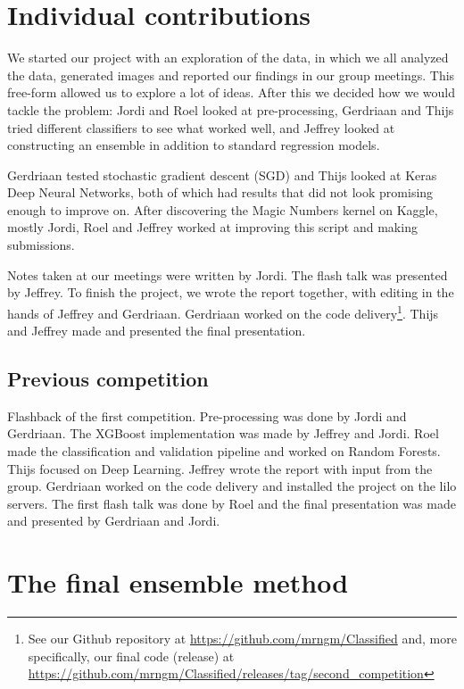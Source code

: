 \documentclass[a4paper,11pt,twocolumn]{article}
\begin{document}
\section{Individual contributions}
We started our project with an exploration of the data, in which we all
analyzed the data, generated images and reported our findings in our group
meetings. This free-form allowed us to explore a lot of ideas. After this we
decided how we would tackle the problem: Jordi and Roel looked at
pre-processing, Gerdriaan and Thijs tried different classifiers to see what
worked well, and Jeffrey looked at constructing an ensemble in addition to
standard regression models.

Gerdriaan tested stochastic gradient descent (SGD) and Thijs looked at Keras
Deep Neural Networks, both of which had results that did not look promising
enough to improve on. After discovering the Magic Numbers kernel on Kaggle,
mostly Jordi, Roel and Jeffrey worked at improving this script and making
submissions.

Notes taken at our meetings were written by Jordi. The flash talk was presented
by Jeffrey. To finish the project, we wrote the report together, with editing in
the hands of Jeffrey and Gerdriaan. Gerdriaan worked on the code
delivery\footnote{See our Github repository at
\url{https://github.com/mrngm/Classified} and, more specifically, our final code
(release) at
\url{https://github.com/mrngm/Classified/releases/tag/second\_competition}}.
Thijs and Jeffrey made and presented the final presentation.

\subsection*{Previous competition}
Flashback of the first competition. Pre-processing was done by Jordi and Gerdriaan. The XGBoost implementation was made by Jeffrey and Jordi. Roel made the classification and validation pipeline and worked on Random Forests. Thijs focused on Deep Learning. Jeffrey wrote the report with input from the group. Gerdriaan worked on the code delivery and installed the project on the lilo servers. The first flash talk was done by Roel and the final presentation was made and presented by Gerdriaan and Jordi.

\clearpage

\appendix
\section{The final ensemble method}
\label{app:final}
\end{document}
